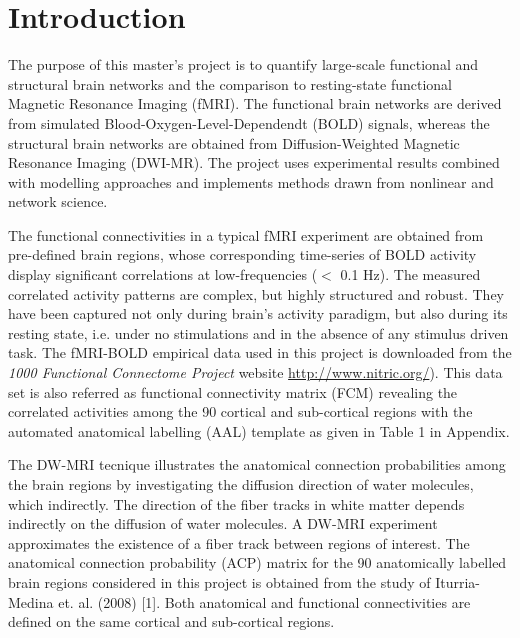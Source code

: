 
\chapter{Introduction} %

\label{Chapter1} %





The purpose of this master's project is to quantify large-scale functional and structural brain networks and the comparison to resting-state functional Magnetic Resonance Imaging (fMRI). The functional brain networks are derived from simulated Blood-Oxygen-Level-Dependendt (BOLD) signals, whereas the structural brain networks are obtained from Diffusion-Weighted Magnetic Resonance Imaging (DWI-MR). The project uses experimental results combined with modelling approaches and implements methods drawn from nonlinear and network science. 

The functional connectivities in a typical fMRI experiment are obtained from pre-defined brain regions, whose corresponding time-series of BOLD activity display significant correlations at low-frequencies ($<$ 0.1 Hz). The measured correlated activity patterns are complex, but highly structured and robust. They have been captured not only during brain's activity paradigm, but also during its resting state, i.e. under no stimulations and in the absence of any stimulus driven task. The fMRI-BOLD empirical data used in this project is downloaded from the \textit{1000 Functional Connectome Project} website \url{http://www.nitric.org/}).  
This data set is also referred as functional connectivity matrix (FCM) revealing the correlated activities among the 90 cortical and sub-cortical regions with the automated anatomical labelling (AAL) template as given in Table 1 in Appendix.

The DW-MRI tecnique illustrates the anatomical connection probabilities among the brain regions by investigating the diffusion direction of water molecules, which indirectly. The direction of the fiber tracks in white matter depends indirectly on the diffusion of water molecules. A DW-MRI experiment approximates the existence of a fiber track between regions of interest. The anatomical connection probability (ACP) matrix for the 90 anatomically labelled brain regions considered in this project is obtained from the study of Iturria-Medina et. al. (2008) [1]. Both anatomical and functional connectivities are defined on the same cortical and sub-cortical regions. 

